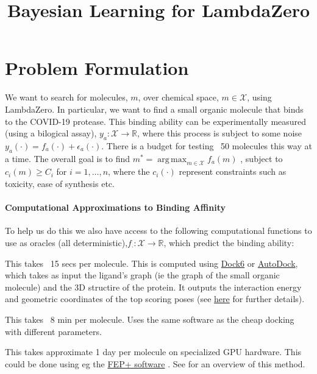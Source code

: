 \documentclass{article}
\title{Bayesian Learning for LambdaZero}
\date{}
\DeclareMathOperator*{\argmax}{arg\,max}
\begin{document}
\maketitle

\section{Problem Formulation}


We want to search for molecules, $m$, over chemical space, $m \in \mathcal{X}$, using LambdaZero.
In particular, we want to find a small organic molecule that binds to the COVID-19 protease. 
This binding ability can be experimentally measured (using a bilogical assay), $y_a: \mathcal{X} \to \mathbb{R}$, 
where this process is subject to some noise $y_a(\cdot) = f_a(\cdot) + \epsilon_a(\cdot)$.
There is a budget for testing ~50 molecules this way at a time.
The overall goal is to find $m^\ast = \argmax_{m \in \mathcal{X}} f_a(m)$ , subject to $c_i(m) \geq C_i$ for $i=1,\ldots, n$,
where the $c_i(\cdot)$ represent constraints such as toxicity, ease of synthesis etc.

\paragraph{Computational Approximations to Binding Affinity} To help us do this we also have access to the following computational functions to use as oracles
(all deterministic),$f_{\cdot}: \mathcal{X} \to \mathbb{R}$,  which predict the binding ability:
\begin{description}[font=\normalfont\sffamily]
  \item[Cheap Docking ($f_D$):] This takes ~15 secs per molecule. This is computed using \href{http://dock.compbio.ucsf.edu/DOCK_6/index.htm}{Dock6} or
    \href{https://ccsb.scripps.edu/autodock/}{AutoDock},
    which takes as input the ligand's graph (ie the graph of the small organic molecule) and the 3D structire of the protein. 
    It outputs the interaction energy and geometric coordinates of the top scoring poses 
    (see \href{http://dock.compbio.ucsf.edu/DOCK_6/tutorials/ligand_sampling_dock/ligand_sampling_dock.html}{here} for further details).
  \item[Expensive Docking ($f_{ED}$):] This takes ~8 min per molecule. 
    Uses the same software as the cheap docking with different parameters. 
  \item[Free Energy Perturbation ($f_{FEP}$):] This takes approximate 1 day per molecule on specialized GPU hardware.
    This could be done using eg the \href{https://www.schrodinger.com/fep}{FEP+ software} \citep{Wang2019-zm, Ciordia2016-xn}.
    See \citep{Shirts2010-mx} for an overview of this method.
\end{description}
\end{document}
